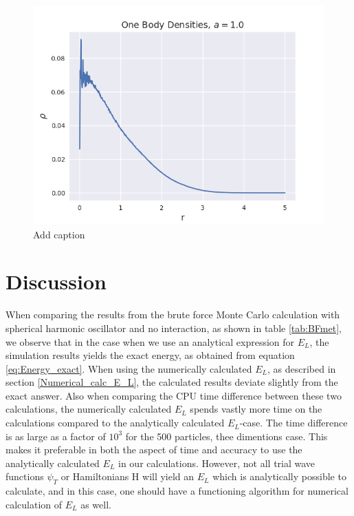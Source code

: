 \documentclass[norsk,a4paper,12pt]{article}
\begin{document}
\begin{figure} [H]
    \centering
    \includegraphics[scale=0.65]{images/ob_a_1.png}
    \caption{Add caption}
    \label{fig:ob1}
\end{figure} 

\section{Discussion}

When comparing the results from the brute force Monte Carlo calculation with spherical harmonic oscillator and no interaction, as shown in table \ref{tab:BFmet}, we observe that in the case when we use an analytical expression for $E_L$, the simulation results yields the exact energy, as obtained from equation \ref{eq:Energy_exact}. When using the numerically calculated $E_L$, as described in section \ref{Numerical_calc_E_L}, the calculated results deviate slightly from the exact answer. Also when comparing the CPU time difference between these two calculations, the numerically calculated $E_L$ spends vastly more time on the calculations compared to the analytically calculated $E_L$-case. The time difference is as large as a factor of $10^3$ for the 500 particles, thee dimentions case. This makes it preferable in both the aspect of time and accuracy to use the analytically calculated $E_L$ in our calculations. However, not all trial wave functions $\psi_T$ or Hamiltonians H will yield an $E_L$ which is analytically possible to calculate, and in this case, one should have a functioning algorithm for numerical calculation of $E_L$ as well.
\par 
\vspace{3mm}
\end{document}
